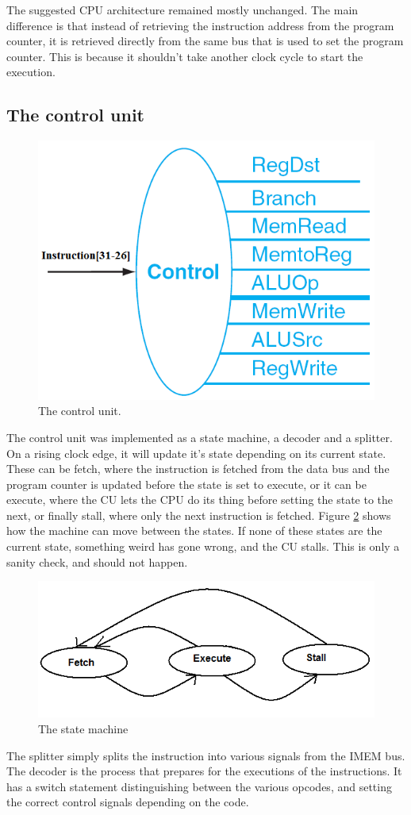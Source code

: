 The suggested CPU architecture remained mostly unchanged.
The main difference is that instead of retrieving the instruction address from the program counter, %
it is retrieved directly from the same bus that is used to set the program
counter. This is because it shouldn't take another clock cycle to start the
execution.

\subsection{The control unit}
\begin{figure}[ht]
    \centering
    \includegraphics[scale=0.3]{figures/controlunit.png}
    \caption{\label{fig:controlUnit}The control unit.}
\end{figure}
The control unit was implemented as a state machine, a decoder and a splitter.
On a rising clock edge, it will update it's state depending on its current
state. These can be fetch, where the instruction is fetched from the data bus
and the program counter is updated before the state is set to execute, or it can
be execute, where the CU lets the CPU do its thing before setting the state to
the next, or finally stall, where only the next instruction is fetched.
Figure \ref{fig:stateMachine} shows how the machine can move between the states. If none
of these states are the current state, something weird has gone wrong, and the
CU stalls. This is only a sanity check, and should not happen.

\begin{figure}[ht]
    \centering
    \includegraphics[scale=0.5]{figures/controlunitstatemachine.png}
    \caption{\label{fig:stateMachine}The state machine}
\end{figure}



The splitter simply splits the instruction into various signals from the IMEM
bus. The decoder is the process that prepares for the executions of the
instructions. It has a switch statement distinguishing between the various
opcodes, and setting the correct control signals depending on the code. 
